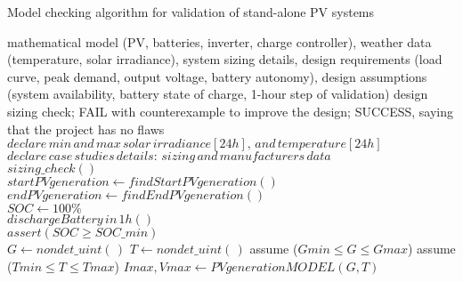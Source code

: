  \begin{algorithm}
 \caption{Model checking algorithm for validation of stand-alone PV systems}
 \begin{algorithmic}[1]
 \begin{scriptsize}
 \renewcommand{\algorithmicrequire}{\textbf{Input:}}
 \renewcommand{\algorithmicensure}{\textbf{Output:}}
 \REQUIRE mathematical model (PV, batteries, inverter, charge controller), weather data (temperature, solar irradiance), system sizing details, design requirements (load curve, peak demand, output voltage, battery autonomy), design assumptions (system availability, battery state of charge, 1-hour step of validation)
 \ENSURE design sizing check; FAIL with counterexample to improve the design; SUCCESS, saying that the project has no flaws
  \STATE $declare \, min \, and \, max \, solar \, irradiance[24h], \, and \, temperature[24h]$\\
  \STATE $declare \, case \, studies \, details: \, sizing \, and \, manufacturers \, data $ \\
  \STATE $sizing \_ check()$ \\
  \STATE $startPVgeneration \leftarrow findStartPVgeneration()$ \\
  \STATE $endPVgeneration \leftarrow findEndPVgeneration()$ \\
  \STATE $SOC \leftarrow 100\%$ \\
	  \STATE $dischargeBattery \, in \, 1h()$ \\
	  \STATE $assert (SOC \geq SOC \_ min)$ \\
  \ENDFOR
    \STATE $G \leftarrow nondet \_ uint(\,)$ 
    \STATE $T \leftarrow nondet \_ uint(\,)$ 
    \STATE assume ($Gmin \leq G \leq Gmax$) 
    \STATE assume ($Tmin \leq T \leq Tmax$) 
    \STATE $Imax, Vmax \leftarrow PVgenerationMODEL (G,T)$ \\

\end{scriptsize}
\end{algorithmic}
\end{algorithm}
